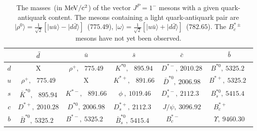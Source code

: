 \documentclass[12pt]{article}
\begin{document}
\begin{table}[h!!]
\begin{center}
\begin{tabular}{|c|c|c|c|c|c|}
\hline
 &$\bar d\rule{0cm}{0.4cm}$&$\bar u$&$\bar s$&$\bar c$&$\bar b$\\
\hline
$d$&X&$\rho^+,\ \phantom{0}775.49$&$K^{*0},\ \phantom{0} 895.94$&$D^{*-},\ 2010.28$&$B^{*0},\ 5325.2\phantom{0}$\\
$u$&$\rho^+,\ \phantom{0}775.49$ &X&$K^{*+},\ \phantom{0}891.66$&$\bar D^{*0},\ 2006.98$&$B^{*+},\ 5325.2\phantom{0}$\\
$s$&$\bar K^{*0},\ \phantom{0}895.94$&$K^{*-},\ \phantom{0}891.66$&$\ \phi\ ,\ 1019.46$&$D^{*-}_s,\ 2112.3\phantom{0}$&$B_s^{*0},\ 5415.4\phantom{0}$\\
$c$&$D^{*+},\ 2010.28$&$D^{*0},\ 2006.98$&$D^{*+}_s,\ 2112.3\phantom{0}$&$J/\psi,\ 3096.92$&$B_c^{*+}\ \ \ \ \ \ \ \ \ \ \ \ $\\
$b$&$\bar B^{*0},\ 5325.2\phantom{0}$&$B^{*-},\ 5325.2\phantom{0}$&$\bar B_s^{*0},\ 5415.4\phantom{0}$&$B_c^{*-}\ \ \ \ \ \ \ \ \ \ \ \ $&$\Upsilon,\ 9460.30$\\
\hline
\end{tabular}
\end{center}
\caption{The masses~(in ${\rm MeV/c^2}$) of the vector $J^P=1^-$ mesons with a given quark-antiquark content. The mesons containing a light quark-antiquark pair are 
\mbox{$|\rho^0\rangle=\frac1{\sqrt2}\left[|u\bar u\rangle-|d\bar d\rangle\right]$~($775.49$)},
\mbox{$|\omega\rangle=\frac1{\sqrt2}\left[|u\bar u\rangle+|d\bar d\rangle\right]$~($782.65$)}.
The $B^{*\pm}_c$ mesons have not yet been observed.}
\end{table}

 
\end{document}
